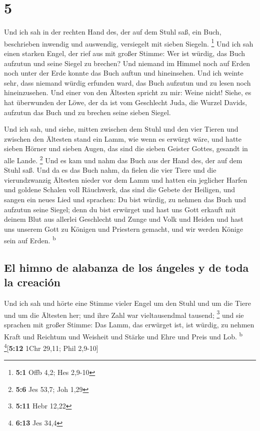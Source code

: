 \hypertarget{section-4}{%
\section{5}\label{section-4}}

 Und ich sah in der rechten Hand des, der auf dem Stuhl
saß, ein Buch, beschrieben inwendig und auswendig, versiegelt mit sieben
Siegeln. \footnote{\textbf{5:1} Offb 4,2; Hes 2,9-10}  Und
ich sah einen starken Engel, der rief aus mit großer Stimme: Wer ist
würdig, das Buch aufzutun und seine Siegel zu brechen? 
Und niemand im Himmel noch auf Erden noch unter der Erde konnte das Buch
auftun und hineinsehen.  Und ich weinte sehr, dass niemand
würdig erfunden ward, das Buch aufzutun und zu lesen noch hineinzusehen.
 Und einer von den Ältesten spricht zu mir: Weine nicht!
Siehe, es hat überwunden der Löwe, der da ist vom Geschlecht Juda, die
Wurzel Davids, aufzutun das Buch und zu brechen seine sieben Siegel.

 Und ich sah, und siehe, mitten zwischen dem Stuhl und den
vier Tieren und zwischen den Ältesten stand ein Lamm, wie wenn es
erwürgt wäre, und hatte sieben Hörner und sieben Augen, das sind die
sieben Geister Gottes, gesandt in alle Lande. \footnote{\textbf{5:6} Jes
  53,7; Joh 1,29}  Und es kam und nahm das Buch aus der
Hand des, der auf dem Stuhl saß.  Und da es das Buch nahm,
da fielen die vier Tiere und die vierundzwanzig Ältesten nieder vor dem
Lamm und hatten ein jeglicher Harfen und goldene Schalen voll Räuchwerk,
das sind die Gebete der Heiligen,  und sangen ein neues
Lied und sprachen: Du bist würdig, zu nehmen das Buch und aufzutun seine
Siegel; denn du bist erwürget und hast uns Gott erkauft mit deinem Blut
aus allerlei Geschlecht und Zunge und Volk und Heiden 
und hast uns unserem Gott zu Königen und Priestern gemacht, und wir
werden Könige sein auf Erden. \textsuperscript{b}

\hypertarget{el-himno-de-alabanza-de-los-uxe1ngeles-y-de-toda-la-creaciuxf3n}{%
\subsection{El himno de alabanza de los ángeles y de toda la
creación}\label{el-himno-de-alabanza-de-los-uxe1ngeles-y-de-toda-la-creaciuxf3n}}

 Und ich sah und hörte eine Stimme vieler Engel um den
Stuhl und um die Tiere und um die Ältesten her; und ihre Zahl war
vieltausendmal tausend; \footnote{\textbf{5:11} Hebr 12,22}
 und sie sprachen mit großer Stimme: Das Lamm, das
erwürget ist, ist würdig, zu nehmen Kraft und Reichtum und Weisheit und
Stärke und Ehre und Preis und Lob. \textsuperscript{b}
\footnote{\textbf{6:13} Jes 34,4}{[}\textbf{5:12} 1Chr 29,11; Phil
2,9-10{]}

